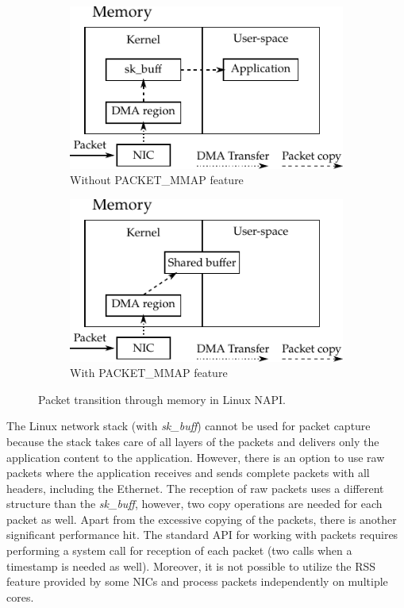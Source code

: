 \begin{figure}[!tb]
    \centering
    \begin{subfigure}[t]{0.5\textwidth}
        \includegraphics{figures/NAPI}
        \caption{Without PACKET\_MMAP feature}
        \label{fig:NAPI_no_MMAP}
    \end{subfigure}%
    \begin{subfigure}[t]{0.5\textwidth}
        \includegraphics{figures/NAPI_MMAP}
        \caption{With PACKET\_MMAP feature}
        \label{fig:NAPI_MMAP}
    \end{subfigure}
    \caption{Packet transition through memory in Linux NAPI.}
    \label{fig:NAPI}
\end{figure}

The Linux network stack (with \emph{sk\_buff}) cannot be used for packet capture because the stack takes care of all layers of the packets and delivers only the application content to the application. However, there is an option to use raw packets where the application receives and sends complete packets with all headers, including the Ethernet. The reception of raw packets uses a different structure than the \emph{sk\_buff}, however, two copy operations are needed for each packet as well. Apart from the excessive copying of the packets, there is another significant performance hit. The standard API for working with packets requires performing a system call for reception of each packet (two calls when a timestamp is needed as well). Moreover, it is not possible to utilize the RSS feature provided by some NICs and process packets independently on multiple cores.

